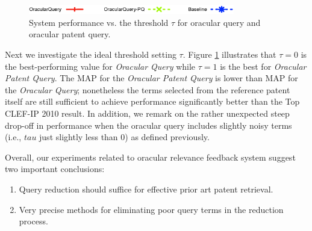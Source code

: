 \begin{figure}[t!]
\begin{centering}
\includegraphics[width=9cm]{imgs/legend}
\par\end{centering}

\begin{centering}
\par\end{centering}

\protect\caption{System performance vs. the threshold $\tau$ for oracular query and oracular patent query.}
\label{fig:oracular}
\end{figure}

Next we investigate the ideal threshold setting $\tau$.
Figure \ref{fig:oracular} illustrates that $\tau=0$ is the
best-performing value for {\em Oracular Query} while $\tau=1$ is the
best for {\em Oracular Patent Query}.  The MAP for the {\em Oracular
Patent Query} is lower than MAP for the {\em Oracular Query};
nonetheless the terms selected from the reference patent itself are
still sufficient to achieve performance significantly better than the
Top CLEF-IP 2010 result.  In addition, we remark on the rather
unexpected steep drop-off in performance when the oracular query
includes slightly noisy terms (i.e., $tau$ just slightly less than 0)
as defined previously.

Overall, our experiments related to oracular relevance feedback system
suggest two important conclusions:
\begin{enumerate}
  \item Query reduction should suffice for effective prior art patent retrieval.
  \item Very precise methods for eliminating poor query terms in the reduction process.
\end{enumerate}

